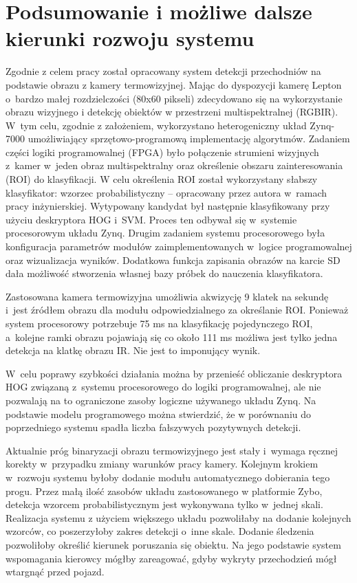 \chapter{Podsumowanie i możliwe dalsze kierunki rozwoju systemu}

Zgodnie z celem pracy został opracowany system detekcji przechodniów na podstawie obrazu z kamery termowizyjnej. 
Mając do dyspozycji kamerę Lepton o~bardzo małej rozdzielczości (80x60 pikseli) zdecydowano się na wykorzystanie obrazu wizyjnego i detekcję obiektów w przestrzeni multispektralnej (RGBIR). 
W~tym celu, zgodnie z założeniem, wykorzystano heterogeniczny układ Zynq-7000 umożliwiający sprzętowo-programową implementację algorytmów.
Zadaniem części logiki programowalnej (FPGA) było połączenie strumieni wizyjnych z~kamer w~jeden obraz multispektralny oraz określenie obszaru zainteresowania (ROI) do klasyfikacji. 
W celu określenia ROI został wykorzystany słabszy klasyfikator: wzorzec probabilistyczny -- opracowany przez autora w~ramach pracy inżynierskiej. 
Wytypowany kandydat był następnie klasyfikowany przy użyciu deskryptora HOG i~SVM. 
Proces ten odbywał się w~systemie procesorowym układu Zynq. 
Drugim zadaniem systemu procesorowego była konfiguracja parametrów modułów zaimplementowanych w~logice programowalnej oraz wizualizacja wyników. 
Dodatkowa funkcja zapisania obrazów na karcie SD dała możliwość stworzenia własnej bazy próbek do nauczenia klasyfikatora.

Zastosowana kamera termowizyjna umożliwia akwizycję 9 klatek na sekundę i~jest źródłem obrazu dla modułu odpowiedzialnego za określanie ROI. 
Ponieważ system procesorowy potrzebuje 75 ms na klasyfikację pojedynczego ROI, a~kolejne ramki obrazu pojawiają się co około 111 ms możliwa jest tylko jedna detekcja na klatkę obrazu IR. 
Nie jest to imponujący wynik. %

W~celu poprawy szybkości działania można by przenieść obliczanie deskryptora HOG związaną z~systemu procesorowego do logiki programowalnej, ale nie pozwalają na to ograniczone zasoby logiczne używanego układu Zynq. 
Na podstawie modelu programowego można stwierdzić, że w porównaniu do poprzedniego systemu spadła liczba fałszywych pozytywnych detekcji. 


Aktualnie próg binaryzacji obrazu termowizyjnego jest stały i~wymaga ręcznej korekty w~przypadku zmiany warunków pracy kamery. Kolejnym krokiem w~rozwoju systemu byłoby dodanie modułu automatycznego dobierania tego progu. Przez małą ilość zasobów układu zastosowanego w platformie Zybo, detekcja wzorcem probabilistycznym jest wykonywana tylko w~jednej skali. Realizacja systemu z użyciem większego układu pozwoliłaby na dodanie kolejnych wzorców, co poszerzyłoby zakres detekcji o~inne skale. Dodanie śledzenia pozwoliłoby określić kierunek poruszania się obiektu. Na jego podstawie system wspomagania kierowcy mógłby zareagować, gdyby wykryty przechodzień mógł wtargnąć przed pojazd.
